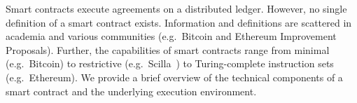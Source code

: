Smart contracts execute agreements on a distributed ledger. %
However, no single definition of a smart contract exists.
Information and definitions are scattered in academia and various communities (e.g.\ Bitcoin and Ethereum Improvement Proposals).
Further, the capabilities of smart contracts range from minimal (e.g.\ Bitcoin) to restrictive (e.g.\ Scilla~\cite{Sergey2018}) to Turing-complete instruction sets (e.g.\ Ethereum). 
We provide a brief overview of the technical components of a smart contract and the underlying execution environment.

